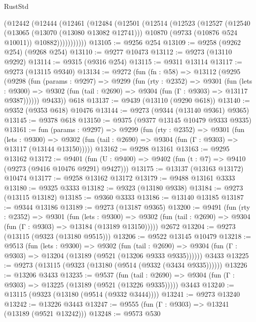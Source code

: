 \begin{lexlean}{RustStd}
\begin{coremodule}
        (@12442
          (@12444
            (@12461
              (@12484
                (@12501
                  (@12514
                    (@12523
                      (@12527
                        (@12540
                          (@13065 (@13070 (@13080 @13082 @12741)))
                          @10870
                          (@9733 (@10876 @524 @10011))
                          @10882)))))))))))
@13105 := @9256 @254
@13109 := @9258 (@9262 @254) (@9268 @254)
@13110 := @9277 @10473
@13112 := @9273 (@13110 @9292)
@13114 := @9315 (@9316 @254)
@13115 := @9311 @13114
@13117 := @9273 (@13115 @9340)
@13134 := @9272
    (fun (fn : @58) =>
    @13112
      (@9295
        (@9298
          (fun (params : @9297) =>
          @9299
            (fun (rty : @2352) =>
            @9301
              (fun (lets : @9300) =>
              @9302 (fun (tail : @2690) => @9304 (fun (Γ : @9303) => @13117 @9387))))))
        @9433))
    @618
@13137 := @9439 (@13110 (@9290 @618))
@13140 := @9352 (@9353 @618) @10476
@13144 := @9273 (@9344 (@13140 @9361) @9365)
@13145 := @9378 @618
@13150 := @9375 (@9377 @13145 @10479 @9333 @9335)
@13161 := fun (params : @9297) =>
  @9299
    (fun (rty : @2352) =>
    @9301
      (fun (lets : @9300) =>
      @9302 (fun (tail : @2690) => @9304 (fun (Γ : @9303) => @13117 (@13144 @13150)))))
@13162 := @9298 @13161
@13163 := @9295 @13162
@13172 := @9401
    (fun (U : @9400) => @9402 (fun (t : @7) => @9410 (@9273 (@9416 @10476 @9291) @9427)))
@13175 := @13137 (@13163 @13172) @10474
@13177 := @9258 @13162 @13172
@13179 := @9488 @13161 @3333
@13180 := @9325 @3333
@13182 := @9323 (@13180 @9338)
@13184 := @9273 (@13115 @13182)
@13185 := @9360 @3333
@13186 := @13140 @13185
@13187 := @9344 @13186
@13189 := @9273 (@13187 @9365)
@13200 := @9491
    (fun (rty : @2352) =>
    @9301
      (fun (lets : @9300) =>
      @9302 (fun (tail : @2690) => @9304 (fun (Γ : @9303) => @13184 (@13189 @13150)))))
    @2672
@13204 := @9273 (@13115 (@9323 (@13180 @9515)))
@13206 := @9522 @13145 @10479
@13218 := @9513
    (fun (lets : @9300) =>
    @9302
      (fun (tail : @2690) =>
      @9304 (fun (Γ : @9303) => @13204 (@13189 (@9521 (@13206 @9333 @9335))))))
    @3433
@13225 := @9273 (@13115 (@9323 (@13180 (@9514 (@9332 (@3434 @9335))))))
@13226 := @13206 @3433
@13235 := @9537
    (fun (tail : @2690) => @9304 (fun (Γ : @9303) => @13225 (@13189 (@9521 (@13226 @9335)))))
    @3443
@13240 := @13115 (@9323 (@13180 (@9514 (@9332 @3444))))
@13241 := @9273 @13240
@13242 := @13226 @3443
@13247 := @9555 (fun (Γ : @9303) => @13241 (@13189 (@9521 @13242)))
@13248 := @9573 @530

\end{coremodule}
\end{lexlean}
